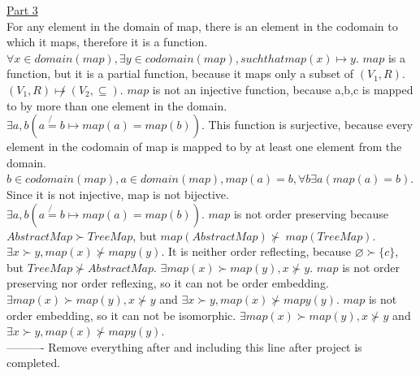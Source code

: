 \documentclass[12pt]{article}
\begin{document}
\noindent\underline{Part 3}\\
For any element in the domain of map, there is an element in the codomain to which it maps, therefore it is a function. $ \forall x \in domain(map), \exists y \in codomain(map), such that map(x)\mapsto y$. $map$ is a function, but it is a partial function, because it maps only a subset of $(V_{1},R)$.  $(V_{1},R)\not \mapsto (V_{2}, \subseteq)$. $map$ is not an injective function, because {a,b,c} is mapped to by more than one element in the domain. $\exists a,b(a\not {{=}}b\mapsto map(a){{=}}map(b))$. This function is surjective, because every element in the codomain of map is mapped to by at least one element from the domain. $b \in codomain(map), a \in domain(map), map(a)=b, \forall b\exists a(map(a){{=}}b)$. Since it is not injective, map is not bijective.  $\exists a,b(a\not {{=}}b\mapsto map(a){{=}}map(b))$. $map$ is not order preserving because $ AbstractMap \succ TreeMap$, but $map(AbstractMap) \not \succ\ map(TreeMap)$. $\exists x \succ y, map(x) \not \succ mapy(y)$. It is neither order reflecting, because $\varnothing \succ \{c\}$, but $TreeMap \not \succ AbstractMap$. $\exists map(x) \succ map(y), x \not \succ y$. $map$ is not order preserving nor order reflexing, so it can not be order embedding. $\exists map(x) \succ map(y), x \not \succ y$ and $\exists x \succ y, map(x) \not \succ mapy(y)$. $map$ is not order embedding, so it can not be isomorphic. $\exists map(x) \succ map(y), x \not \succ y$ and $\exists x \succ y, map(x) \not \succ mapy(y)$.
\\
\noindent ---------- Remove everything after and including this line after project is completed.
\end{document}
